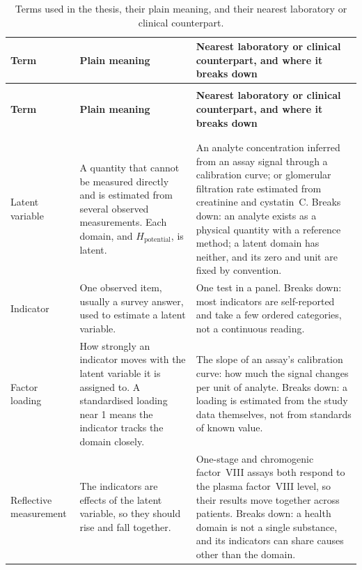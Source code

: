 \begingroup
\footnotesize
\setlength{\tabcolsep}{4pt}
\renewcommand{\arraystretch}{1.2}
\begin{longtable}{>{\raggedright\arraybackslash}p{2.7cm} >{\raggedright\arraybackslash}p{4.6cm} >{\raggedright\arraybackslash}p{6.6cm}}
\caption{Terms used in the thesis, their plain meaning, and their nearest laboratory or clinical counterpart.}
\label{tab:guide-glossary}\\
\toprule
\textbf{Term} & \textbf{Plain meaning} & \textbf{Nearest laboratory or clinical counterpart, and where it breaks down} \\
\midrule
\endfirsthead
\multicolumn{3}{l}{\textit{Table~\ref{tab:guide-glossary} continued}} \\
\toprule
\textbf{Term} & \textbf{Plain meaning} & \textbf{Nearest laboratory or clinical counterpart, and where it breaks down} \\
\midrule
\endhead
\midrule
\multicolumn{3}{r}{\textit{Continued on next page}} \\
\endfoot
\bottomrule
\endlastfoot
\multicolumn{3}{l}{\textit{Measurement}} \\
\addlinespace
Latent variable & A quantity that cannot be measured directly and is estimated from several observed measurements. Each domain, and $H_{\text{potential}}$, is latent. & An analyte concentration inferred from an assay signal through a calibration curve; or glomerular filtration rate estimated from creatinine and cystatin~C. Breaks down: an analyte exists as a physical quantity with a reference method; a latent domain has neither, and its zero and unit are fixed by convention. \\
Indicator & One observed item, usually a survey answer, used to estimate a latent variable. & One test in a panel. Breaks down: most indicators are self-reported and take a few ordered categories, not a continuous reading. \\
Factor loading & How strongly an indicator moves with the latent variable it is assigned to. A standardised loading near 1 means the indicator tracks the domain closely. & The slope of an assay's calibration curve: how much the signal changes per unit of analyte. Breaks down: a loading is estimated from the study data themselves, not from standards of known value. \\
Reflective measurement & The indicators are effects of the latent variable, so they should rise and fall together. & One-stage and chromogenic factor~VIII assays both respond to the plasma factor~VIII level, so their results move together across patients. Breaks down: a health domain is not a single substance, and its indicators can share causes other than the domain. \\

\end{longtable}
